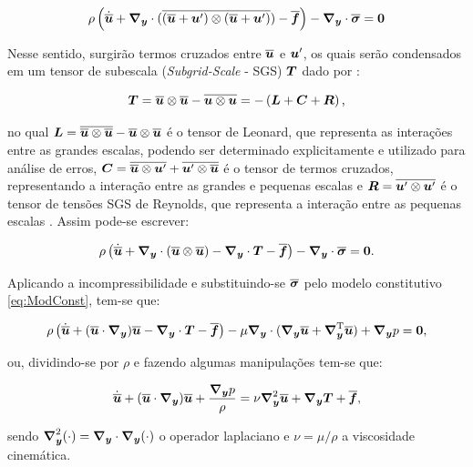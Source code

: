\begin{equation}
    \rho\bigpar{\dot{\BBB{u}}+\Ny\cdot(\overline{(\BBB{u}+\BB{u}')\otimes(\BBB{u}+\BB{u}')})-\BBB{f}}-\Ny\cdot\bar{\tens}=\BB{0}
\end{equation}

Nesse sentido, surgirão termos cruzados entre $\BBB{u}$ e $\BB{u}'$, os quais serão condensados em um tensor de subescala (\textit{Subgrid-Scale} - SGS) $\BB{T}$ dado por \cite{piomelli1999large,hughes2000large}:

\begin{equation}
    \BB{T}=\BBB{u}\otimes\BBB{u}-\overline{\BB{u}\otimes\BB{u}}=-\bigpar{\BB{L}+\BB{C}+\BB{R}}\text{,}
\end{equation}

\noindent no qual $\BB{L}=\overline{\BBB{u}\otimes\BBB{u}}-\BBB{u}\otimes\BBB{u}$ é o tensor de Leonard, que representa as interações entre as grandes escalas, podendo ser determinado explicitamente e utilizado para análise de erros, $\BB{C}=\overline{\BBB{u}\otimes\BB{u}'}+\overline{\BB{u}'\otimes\BBB{u}}$ é o tensor de termos cruzados, representando a interação entre as grandes e pequenas escalas e $\BB{R}=\overline{\BB{u}'\otimes\BB{u}'}$ é o tensor de tensões SGS de Reynolds, que representa a interação entre as pequenas escalas \cite{piomelli1999large}. Assim pode-se escrever:

\begin{equation}
    \rho\bigpar{\dot{\BBB{u}}+\Ny\cdot(\BBB{u}\otimes\BBB{u})-\Ny\cdot\BB{T}-\BBB{f}}-\Ny\cdot\bar{\tens}=\BB{0}\text{.}
\end{equation}

Aplicando a incompressibilidade e substituindo-se $\bar{\tens}$ pelo modelo constitutivo \eqref{eq:ModConst}, tem-se que:

\begin{equation}
    \rho\bigpar{\dot{\BBB{u}}+(\BBB{u}\cdot\Ny)\BBB{u}-\Ny\cdot\BB{T}-\BBB{f}}-\mu\Ny\cdot(\Ny\BBB{u}+\NyT\BBB{u})+\Ny p=\BB{0}\text{,}\label{eq:ConMasLES}
\end{equation}

\noindent ou, dividindo-se por $\rho$ e fazendo algumas manipulações tem-se que:

\begin{equation}
    \dot{\BBB{u}}+(\BBB{u}\cdot\Ny)\BBB{u}+\frac{\Ny p}{\rho}=\nu\Lapl\BBB{u}+\Ny\BB{T}+\BBB{f}\text{,}
\end{equation}

\noindent sendo $\Lapl(\cdot)=\Ny\cdot\Ny(\cdot)$ o operador laplaciano e $\nu=\mu/\rho$ a viscosidade cinemática.

